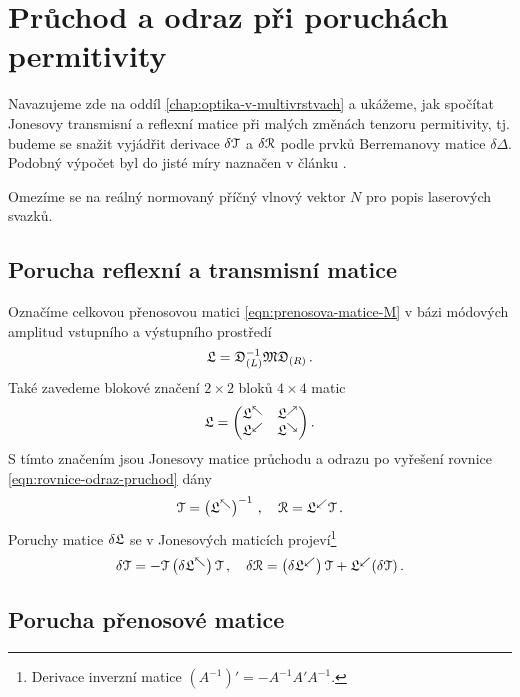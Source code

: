 \section{Průchod a odraz při poruchách permitivity}
\label{app:berreman}

Navazujeme zde na oddíl \ref{chap:optika-v-multivrstvach} a ukážeme, jak spočítat Jonesovy transmisní a reflexní matice při malých změnách tenzoru permitivity, tj. budeme se snažit vyjádřit derivace $\delta\mathcal{T}$ a $\delta\mathcal{R}$ podle prvků Berremanovy matice $\delta\Delta$.
Podobný výpočet byl do jisté míry naznačen v článku \cite{bertrandGeneralAnalyticalTreatment2001}.

Omezíme se na reálný normovaný příčný vlnový vektor $N$ pro popis laserových svazků.

\subsection*{Porucha reflexní a transmisní matice}

Označíme celkovou přenosovou matici \eqref{eqn:prenosova-matice-M} v bázi módových amplitud vstupního a výstupního prostředí
\begin{equation}
    \mathfrak{L} = \mathfrak{D}_{(L)}^{-1} \mathfrak{M}  \mathfrak{D}_{(R)} \,.
\end{equation}
Také zavedeme blokové značení $2\times2$ bloků $4\times4$ matic
\begin{equation}
    \mathfrak{L} = \begin{pmatrix} \mathfrak{L}^\nwarrow & \mathfrak{L}^\nearrow \\
    \mathfrak{L}^\swarrow & \mathfrak{L}^\searrow \end{pmatrix} .
\end{equation}
S tímto značením jsou Jonesovy matice průchodu a odrazu po vyřešení rovnice \eqref{eqn:rovnice-odraz-pruchod} dány
\begin{equation}
    \mathcal{T} = \left(\mathfrak{L}^\nwarrow\right)^{-1} \,, \quad \mathcal{R}=\mathfrak{L}^\swarrow \mathcal{T} \,.
\end{equation}
Poruchy matice $\delta\mathfrak{L}$ se v Jonesových maticích projeví\footnote{Derivace inverzní matice $(A^{-1})'=-A^{-1}A'A^{-1}$.}
\begin{equation}
    \label{eqn:app-derivace-RT}
    \delta\mathcal{T} = -\mathcal{T} \left(\delta\mathfrak{L}^\nwarrow \right) \mathcal{T} \,, \quad \delta\mathcal{R}=\left(\delta\mathfrak{L}^\swarrow\right) \mathcal{T} + \mathfrak{L}^\swarrow (\delta\mathcal{T}) \,.
\end{equation}

\subsection*{Porucha přenosové matice}
